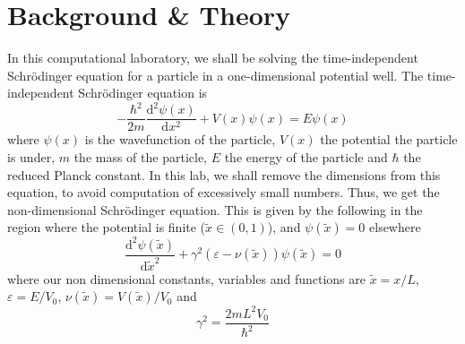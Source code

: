 \documentclass[10pt,a4paper]{article}
\theoremstyle{definition}
\theoremstyle{remark}
\begin{document}
\section{Background \& Theory}
In this computational laboratory, we shall be solving the time-independent Schr\"{o}dinger equation for a particle in a one-dimensional potential well. The time-independent Schr\"{o}dinger equation is 
\begin{equation}
    -\frac{\hbar^2}{2m}\frac{\mathrm{d}^2\psi(x)}{\mathrm{d}x^2} + V(x)\psi(x) = E\psi(x)
\end{equation}
where $\psi(x)$ is the wavefunction of the particle, $V(x)$ the potential the particle is under, $m$ the mass of the particle, $E$ the energy of the particle and $\hbar$ the reduced Planck constant. In this lab, we shall remove the dimensions from this equation, to avoid computation of excessively small numbers. Thus, we get the non-dimensional Schr\"{o}dinger equation. This is given by the following in the region where the potential is finite ($\tilde{x}\in (0,1)$), and $\psi(\tilde{x}) = 0$ elsewhere
\begin{equation}
    \label{eq: non_dim_schrodinger}
    \frac{\mathrm{d}^2\psi(\tilde{x})}{\mathrm{d}\tilde{x}^2} + \gamma^2(\varepsilon-\nu(\tilde{x}))\psi(\tilde{x}) = 0
\end{equation}
where our non dimensional constants, variables and functions are $\tilde{x} = x/L$, $\varepsilon = E/V_0$, $\nu(\tilde{x}) = V(\tilde{x})/V_0$ and 
\begin{equation}
    \gamma^2 = \frac{2mL^2V_0}{\hbar^2}
\end{equation}
\end{document}
